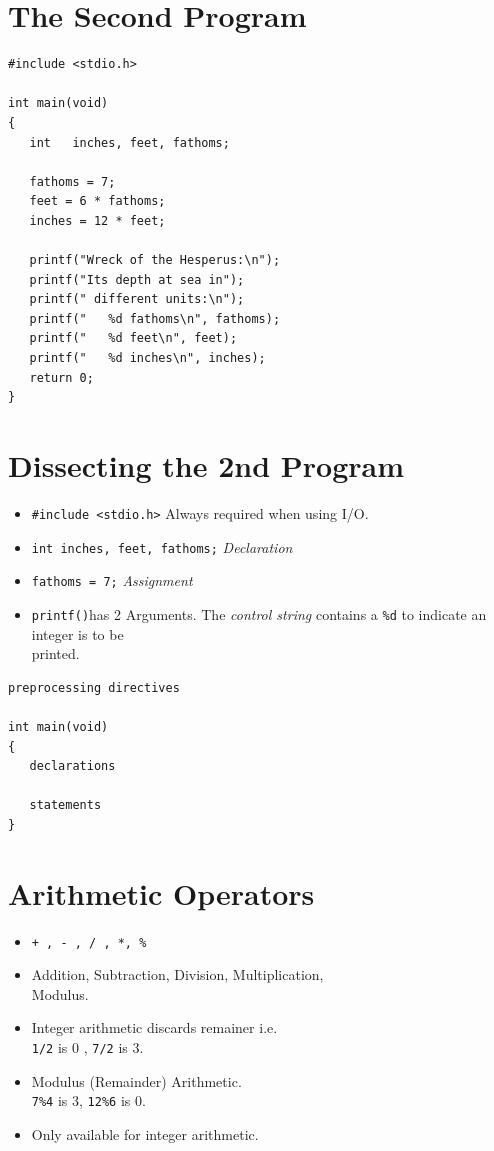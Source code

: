 \documentclass[a4,portraitt]{slides}
\begin{document}
\newpage
\newpage
\section*{The Second Program}

\begin{verbatim}
#include <stdio.h>

int main(void)
{
   int   inches, feet, fathoms;

   fathoms = 7;
   feet = 6 * fathoms;
   inches = 12 * feet;

   printf("Wreck of the Hesperus:\n");
   printf("Its depth at sea in");
   printf(" different units:\n");
   printf("   %d fathoms\n", fathoms);
   printf("   %d feet\n", feet);
   printf("   %d inches\n", inches);
   return 0;
}
\end{verbatim}

\section*{Dissecting the 2nd Program}

\begin{itemize}
\item \verb+#include <stdio.h>+ Always required when using I/O.
\item \verb+int inches, feet, fathoms;+ {\it Declaration}
\item \verb+fathoms = 7;+ {\it  Assignment }
\item \verb+printf()+has 2 Arguments.
The {\it control string}
contains a \verb+%d+ to indicate an integer is to be\\ printed.
\end{itemize}

\begin{verbatim}
preprocessing directives

int main(void)
{
   declarations

   statements
}
\end{verbatim}
\newpage
\section*{ Arithmetic Operators }

\begin{itemize}
\item \verb^+ , - , / , *, %^
\item Addition, Subtraction, Division, Multiplication,\\ Modulus.
\item Integer arithmetic discards remainer i.e.\\
\verb+1/2+ is 0 , \verb+7/2+ is 3.
\item Modulus (Remainder) Arithmetic.\\
\verb+7%4+ is 3, \verb+12%6+ is 0.

\item
Only available for integer arithmetic.
\end{itemize}
\end{document}
